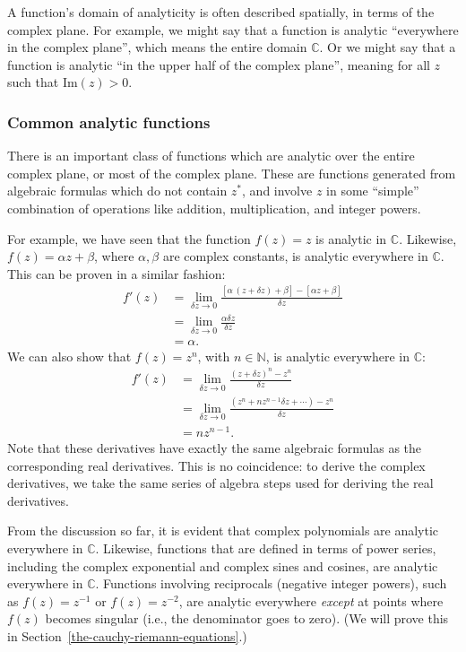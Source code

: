 \documentclass[10pt,a4paper]{article}
\begin{document}
A function's domain of analyticity is often described spatially, in
terms of the complex plane. For example, we might say that a function
is analytic ``everywhere in the complex plane'', which means the
entire domain $\mathbb{C}$. Or we might say that a function is
analytic ``in the upper half of the complex plane'', meaning for all
$z$ such that $\mathrm{Im}(z) > 0$.

\subsubsection{Common analytic functions}
\label{common-analytic-functions}

There is an important class of functions which are analytic over the
entire complex plane, or most of the complex plane. These are
functions generated from algebraic formulas which do not contain
$z^*$, and involve $z$ in some ``simple'' combination of operations
like addition, multiplication, and integer powers.

For example, we have seen that the function $f(z) = z$ is analytic in
$\mathbb{C}$. Likewise, $f(z) = \alpha z + \beta$, where $\alpha,
\beta$ are complex constants, is analytic everywhere in
$\mathbb{C}$. This can be proven in a similar fashion:
\begin{align}
  f'(z) &= \lim_{\delta z\rightarrow 0} \frac{[\alpha\,(z+\delta z) + \beta] - [\alpha z + \beta]}{\delta z} \\
  &= \lim_{\delta z\rightarrow 0} \frac{\alpha \delta z}{\delta z} \\
  &= \alpha.
\end{align}
We can also show that $f(z) = z^n$, with $n \in \mathbb{N}$, is
analytic everywhere in $\mathbb{C}$:
\begin{align}
  f'(z) &= \lim_{\delta z\rightarrow 0} \frac{(z+\delta z)^n - z^n}{\delta z} \\
  &= \lim_{\delta z\rightarrow 0}
  \frac{(z^n + n z^{n-1} \delta z + \cdots) - z^n}{\delta z} \\
  &= n z^{n-1}.
\end{align}
Note that these derivatives have exactly the same algebraic formulas as
the corresponding real derivatives. This is no coincidence: to derive
the complex derivatives, we take the same series of algebra steps used
for deriving the real derivatives.

From the discussion so far, it is evident that complex polynomials are
analytic everywhere in $\mathbb{C}$. Likewise, functions that are
defined in terms of power series, including the complex exponential
and complex sines and cosines, are analytic everywhere in
$\mathbb{C}$. Functions involving reciprocals (negative integer
powers), such as $f(z) = z^{-1}$ or $f(z) = z^{-2}$, are analytic
everywhere \emph{except} at points where $f(z)$ becomes singular
(i.e., the denominator goes to zero). (We will prove this in
Section~\ref{the-cauchy-riemann-equations}.)
\end{document}
